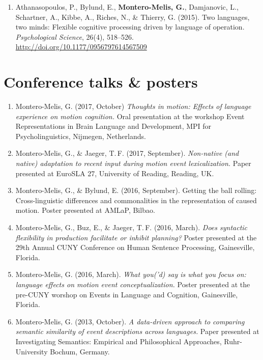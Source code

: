 \documentclass[margin, 11pt]{res} %
\begin{document}
\begin{resume}
\begin{enumerate}
	\item Athanasopoulos, P., Bylund, E., \textbf{Montero-Melis, G.}, Damjanovic, L., Schartner, A., Kibbe, A., Riches, N., \& Thierry, G. (2015). Two languages, two minds: Flexible cognitive processing driven by language of operation. \emph{Psychological Science}, 26(4), 518--526. \url{http://doi.org/10.1177/0956797614567509}

\end{enumerate}


\section{\sc Conference talks \& posters}
\begin{enumerate}

\item Montero-Melis, G. (2017, October) \textit{Thoughts in motion: Effects of language experience on motion cognition.} Oral presentation at the workshop Event Representations in Brain Language and Development, MPI for Psycholinguistics, Nijmegen, Netherlands.

\item Montero-Melis, G., \& Jaeger, T.\,F. (2017, September). \textit{Non-native (and native) adaptation to recent input during motion event lexicalization.} Paper presented at EuroSLA 27, University of Reading, Reading, UK.

\item Montero-Melis, G., \& Bylund, E. (2016, September). Getting the ball rolling: Cross-linguistic differences and commonalities in the representation of caused motion. Poster presented at AMLaP, Bilbao.

\item Montero-Melis, G., Buz, E., \& Jaeger, T.\,F. (2016, March). \textit{Does syntactic flexibility in production facilitate or inhibit planning?} Poster presented at the 29th Annual CUNY Conference on Human Sentence Processing, Gainesville, Florida.

\item Montero-Melis, G. (2016, March). \textit{What you('d) say is what you focus on: language effects on motion event conceptualization.} Poster presented at the pre-CUNY worshop on Events in Language and Cognition, Gainesville, Florida.

\item Montero-Melis, G. (2013, October). \textit{A data-driven approach to comparing semantic similarity of event descriptions across languages.} Paper presented at Investigating Semantics: Empirical and Philosophical Approaches, Ruhr-University Bochum, Germany.


\end{enumerate}
\end{resume}
\end{document}
